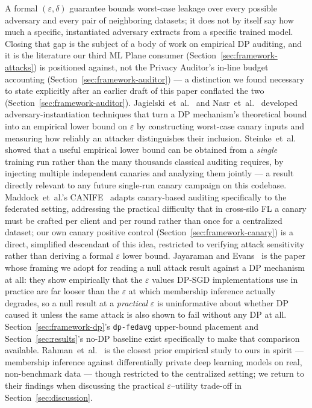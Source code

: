 A formal $(\varepsilon,\delta)$ guarantee bounds worst-case leakage
over every possible adversary and every pair of neighboring datasets;
it does not by itself say how much a specific, instantiated adversary
extracts from a specific trained model. Closing that gap is the
subject of a body of work on empirical DP auditing, and it is the
literature our third ML Plane consumer
(Section~\ref{sec:framework-attacks}) is positioned against, not the
Privacy Auditor's in-line budget accounting
(Section~\ref{sec:framework-auditor}) --- a distinction we found
necessary to state explicitly after an earlier draft of this paper
conflated the two (Section~\ref{sec:framework-auditor}).
Jagielski~et~al.~\cite{jagielski2020auditing} and
Nasr~et~al.~\cite{nasr2021adversary} developed adversary-instantiation
techniques that turn a DP mechanism's theoretical bound into an
empirical lower bound on $\varepsilon$ by constructing worst-case
canary inputs and measuring how reliably an attacker distinguishes
their inclusion. Steinke~et~al.~\cite{steinke2023privacy} showed that
a useful empirical lower bound can be obtained from a \emph{single}
training run rather than the many thousands classical auditing
requires, by injecting multiple independent canaries and analyzing
them jointly --- a result directly relevant to any future single-run
canary campaign on this codebase. Maddock~et~al.'s
CANIFE~\cite{maddock2023canife} adapts canary-based auditing
specifically to the federated setting, addressing the practical
difficulty that in cross-silo FL a canary must be crafted per client
and per round rather than once for a centralized dataset; our own
canary positive control (Section~\ref{sec:framework-canary}) is a
direct, simplified descendant of this idea, restricted to verifying
attack sensitivity rather than deriving a formal $\varepsilon$ lower
bound.
Jayaraman and Evans~\cite{jayaraman2019evaluating} is the paper whose
framing we adopt for reading a null attack result against a DP
mechanism at all: they show empirically that the $\varepsilon$ values
DP-SGD implementations use in practice are far looser than the
$\varepsilon$ at which membership inference actually degrades, so a
null result at a \emph{practical} $\varepsilon$ is uninformative about
whether DP caused it unless the same attack is also shown to fail
without any DP at all. Section~\ref{sec:framework-dp}'s
\texttt{dp-fedavg} upper-bound placement and
Section~\ref{sec:results}'s no-DP baseline exist specifically to make
that comparison available. Rahman~et~al.~\cite{rahman2018membership}
is the closest prior empirical study to ours in spirit --- membership
inference against differentially private deep learning models on
real, non-benchmark data --- though restricted to the centralized
setting; we return to their findings when discussing the practical
$\varepsilon$--utility trade-off in Section~\ref{sec:discussion}.

